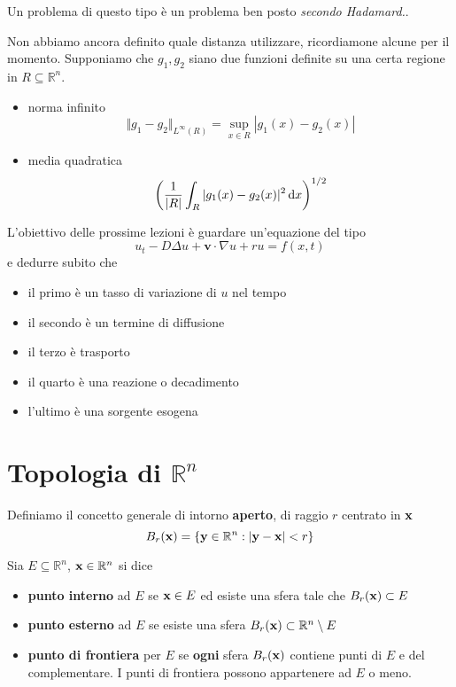 Un problema di questo tipo è un problema ben posto \textit{secondo Hadamard.}.

Non abbiamo ancora definito quale distanza utilizzare, ricordiamone alcune per il momento. Supponiamo che $g_{1},g_{2}$ siano due funzioni definite su una certa regione in $R\subseteq \mathbb{R}^{n}$.
\begin{itemize}
    \item norma infinito
          \begin{equation*}
              \Vert g_{1} -g_{2}\Vert _{L^{\infty }(R)} =\sup _{x\in R}| g_{1}(x) -g_{2}(x)|
          \end{equation*}
    \item media quadratica
          \begin{equation*}
              \left(\frac{1}{| R| }\int _{R}| g_{1}(x) -g_{2}(x)| ^{2} \,\mathrm d x\right)^{1/2}
          \end{equation*}
\end{itemize}

L'obiettivo delle prossime lezioni è guardare un'equazione del tipo
\begin{equation*}
    u_{t} -D\Delta u+\mathbf{v} \cdotp \nabla u+ru=f(x,t)
\end{equation*}
e dedurre subito che
\begin{itemize}
    \item il primo è un tasso di variazione di $u$ nel tempo
    \item il secondo è un termine di diffusione
    \item il terzo è trasporto
    \item il quarto è una reazione o decadimento
    \item l'ultimo è una sorgente esogena
\end{itemize}

\section{Topologia di \texorpdfstring{$\mathbb{R}^{n}$}{Rn}}
\begin{definition}
     Definiamo il concetto generale di intorno \textbf{aperto}, di raggio $r$ centrato in $\mathbf{x}$
    \begin{equation*}
        B_{r}(\mathbf{x}) =\left\{\mathbf{y}\in \mathbb{R}^{n} :| \mathbf{y}-\mathbf{x}| < r\right\}
    \end{equation*}
\end{definition}
Sia $E\subseteq \mathbb{R}^{n}$, $\mathbf{x}\in \mathbb{R}^{n}$ si dice
\begin{itemize}
    \item \textbf{punto interno} ad $E$ se $\mathbf{x}\in E$ ed esiste una sfera tale che $B_{r}(\mathbf{x}) \subset E$
    \item \textbf{punto esterno} ad $E$ se esiste una sfera $B_{r}(\mathbf{x}) \subset \mathbb{R}^{n} \setminus E$
    \item \textbf{punto di frontiera} per $E$ se \textbf{ogni} sfera $B_{r}(\mathbf{x})$ contiene punti di $E$ e del complementare. I punti di frontiera possono appartenere ad $E$ o meno.
\end{itemize}


